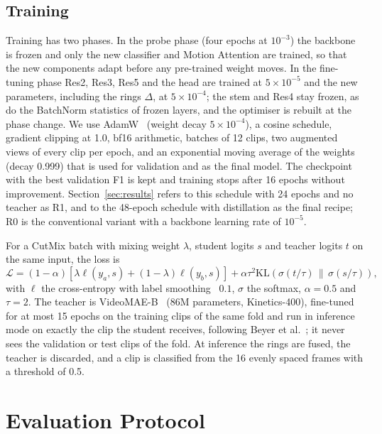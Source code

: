 \documentclass[conference]{IEEEtran}
\begin{document}
\subsection{Training}
\label{sec:training}

Training has two phases. In the probe phase (four epochs at $10^{-3}$) the
backbone is frozen and only the new classifier and Motion Attention are
trained, so that the new components adapt before any pre-trained weight
moves. In the fine-tuning phase Res2, Res3, Res5 and the head are trained
at $5\times10^{-5}$ and the new parameters, including the rings $\Delta$,
at $5\times10^{-4}$; the stem and Res4 stay frozen, as do the BatchNorm
statistics of frozen layers, and the optimiser is rebuilt at the phase
change. We use AdamW~\cite{adamw} (weight decay $5\times10^{-4}$), a cosine
schedule, gradient clipping at 1.0, bf16 arithmetic, batches of 12 clips,
two augmented views of every clip per epoch, and an exponential moving
average of the weights (decay 0.999) that is used for validation and as the
final model. The checkpoint with the best validation F1 is kept and
training stops after 16 epochs without improvement. Section~\ref{sec:results}
refers to this schedule with 24 epochs and no teacher as R1, and to the
48-epoch schedule with distillation as the final recipe; R0 is the
conventional variant with a backbone learning rate of $10^{-5}$.

For a CutMix batch with mixing weight $\lambda$, student logits
$s$ and teacher logits $t$ on the same input, the loss is
\begin{equation}
  \mathcal{L} = (1-\alpha)\left[\lambda \ell(y_a, s) + (1-\lambda) \ell(y_b, s)\right]
  + \alpha \tau^2 \mathrm{KL}\!\left(\sigma(t/\tau) \,\|\, \sigma(s/\tau)\right),
  \label{eq:kd}
\end{equation}
with $\ell$ the cross-entropy with label smoothing~\cite{labelsmoothing}
$0.1$, $\sigma$ the softmax, $\alpha = 0.5$ and $\tau = 2$. The teacher is
VideoMAE-B~\cite{videomae} (86M parameters, Kinetics-400), fine-tuned for
at most 15 epochs on the training clips of the same fold and run in
inference mode on exactly the clip the student receives, following Beyer et
al.~\cite{beyer2022}; it never sees the validation or test clips of the
fold. At inference the rings are fused, the teacher is discarded, and a
clip is classified from the 16 evenly spaced frames with a threshold of
0.5.

\section{Evaluation Protocol}
\label{sec:protocol}
\end{document}
